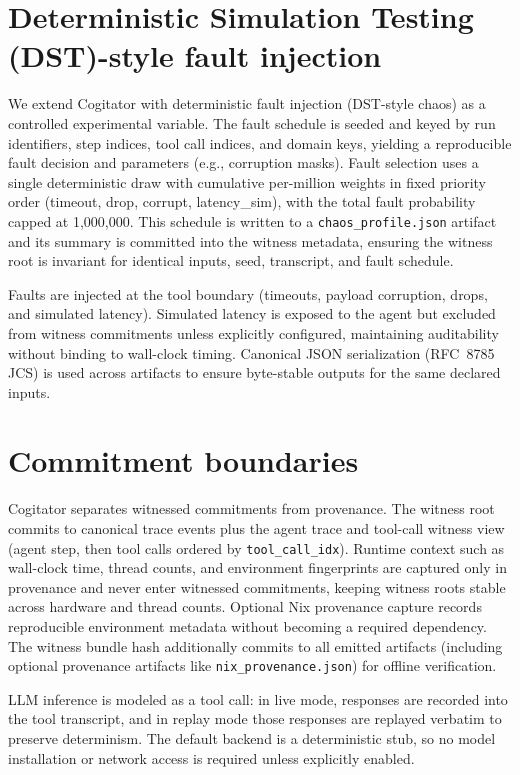 \section{Deterministic Simulation Testing (DST)-style fault injection}
\label{sec:dst}

We extend Cogitator with deterministic fault injection (DST-style chaos) as a controlled
experimental variable. The fault schedule is seeded and keyed by run identifiers,
step indices, tool call indices, and domain keys, yielding a reproducible fault decision
and parameters (e.g., corruption masks). Fault selection uses a single deterministic
draw with cumulative per-million weights in fixed priority order (timeout, drop, corrupt,
latency\_sim), with the total fault probability capped at 1{,}000{,}000. This schedule is
written to a
\texttt{chaos\_profile.json} artifact and its summary is committed into the witness
metadata, ensuring the witness root is invariant for identical inputs, seed, transcript,
and fault schedule.

Faults are injected at the tool boundary (timeouts, payload corruption, drops, and
simulated latency). Simulated latency is exposed to the agent but excluded from witness
commitments unless explicitly configured, maintaining auditability without binding to
wall-clock timing. Canonical JSON serialization (RFC~8785 JCS) is used across artifacts
to ensure byte-stable outputs for the same declared inputs.

\section{Commitment boundaries}
\label{sec:commitments}

Cogitator separates witnessed commitments from provenance. The witness root commits to
canonical trace events plus the agent trace and tool-call witness view (agent step, then
tool calls ordered by \texttt{tool\_call\_idx}). Runtime context such as wall-clock time,
thread counts, and environment fingerprints are captured only in provenance and never
enter witnessed commitments, keeping witness roots stable across hardware and thread
counts. Optional Nix provenance capture records reproducible environment metadata without
becoming a required dependency. The witness bundle hash additionally commits to all
emitted artifacts (including optional provenance artifacts like
\texttt{nix\_provenance.json}) for offline verification.

LLM inference is modeled as a tool call: in live mode, responses are recorded into the
tool transcript, and in replay mode those responses are replayed verbatim to preserve
determinism. The default backend is a deterministic stub, so no model installation or
network access is required unless explicitly enabled.

